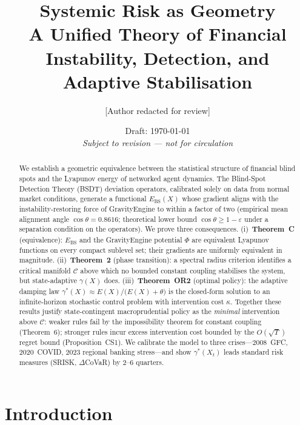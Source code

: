 \documentclass[11pt]{article}
\title{%
  \textbf{Systemic Risk as Geometry}\\[4pt]
  \large A Unified Theory of Financial Instability, Detection,
         and Adaptive Stabilisation
}
\author{%
  [Author redacted for review]
}
\date{Draft: \today \\ \small\textit{Subject to revision — not for circulation}}
\theoremstyle{definition}
\newcommand{\Ebs}{E_{\mathrm{BS}}}
\newcommand{\Cman}{\mathcal{C}}
\newcommand{\costheta}{\cos\theta}
\begin{document}
\maketitle

\begin{abstract}
We establish a geometric equivalence between the statistical structure of financial
blind spots and the Lyapunov energy of networked agent dynamics.  The Blind-Spot
Detection Theory (BSDT) deviation operators, calibrated solely on data from normal
market conditions, generate a functional $\Ebs(X)$ whose gradient aligns with the
instability-restoring force of GravityEngine to within a factor of two
(empirical mean alignment angle $\costheta = 0.8616$; theoretical lower bound
$\costheta \geq 1 - \varepsilon$ under a separation condition on the operators).
We prove three consequences.
(i)~\textbf{Theorem~C} (equivalence): $\Ebs$ and the GravityEngine potential $\Phi$
are equivalent Lyapunov functions on every compact sublevel set; their gradients
are uniformly equivalent in magnitude.
(ii)~\textbf{Theorem~2} (phase transition): a spectral radius criterion identifies a
critical manifold $\Cman$ above which no bounded constant coupling stabilises the
system, but state-adaptive $\gamma(X)$ does.
(iii)~\textbf{Theorem~OR2} (optimal policy): the adaptive damping law
$\gamma^*(X) \approx E(X)/\bigl(E(X)+\theta\bigr)$ is the closed-form solution to an
infinite-horizon stochastic control problem with intervention cost $\kappa$.
Together these results justify state-contingent macroprudential policy as the
\emph{minimal} intervention above $\Cman$: weaker rules fail by the impossibility
theorem for constant coupling (Theorem~6); stronger rules incur excess intervention
cost bounded by the $O(\sqrt{T})$ regret bound (Proposition~CS1).
We calibrate the model to three crises—2008~GFC, 2020~COVID, 2023 regional banking
stress—and show $\gamma^*(X_t)$ leads standard risk measures (SRISK, $\Delta$CoVaR)
by 2--6 quarters.
\end{abstract}

\tableofcontents
\newpage

\section{Introduction}
\label{sec:intro}
\end{document}
